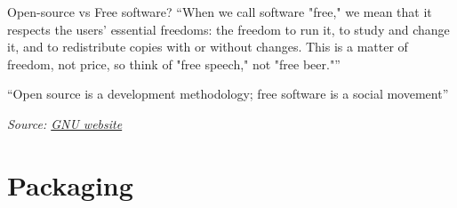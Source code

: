 \documentclass[compress]{beamer}
\newcommand{\source}[2]{{\tiny\it Source: \href{#1}{#2}}}
\begin{document}
\begin{frame}{}

    \begin{exampleblock}{Open-source vs Free software?}
    ``When we call software "free," we mean that it respects the users' essential
    freedoms: the freedom to run it, to study and change it, and to redistribute
    copies with or without changes. This is a matter of freedom, not price, so
    think of "free speech," not "free beer."''

        \vspace{1em}
    ``Open source is a development methodology; free software is a social
        movement''

    \end{exampleblock}

    \source{https://www.gnu.org/philosophy/open-source-misses-the-point.en.html}{GNU
    website}
\end{frame}

\section{Packaging}
\end{document}
